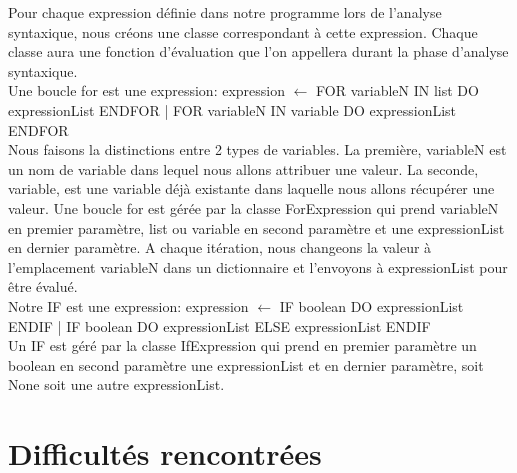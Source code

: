 ﻿\documentclass{report}
\begin{document}
Pour chaque expression définie dans notre programme lors de l'analyse syntaxique, nous créons une classe correspondant à cette expression. Chaque classe aura une fonction d'évaluation que l'on appellera durant la phase d'analyse syntaxique.\\


Une boucle for est une expression: expression $\leftarrow$ FOR variableN IN list DO expressionList ENDFOR | FOR variableN IN variable DO expressionList ENDFOR\\ 
Nous faisons la distinctions entre 2 types de variables. La première, variableN est un nom de variable dans lequel nous allons attribuer une valeur. La seconde, variable, est une variable déjà existante dans laquelle nous allons récupérer une valeur. Une boucle for est gérée par la classe ForExpression qui prend variableN en premier paramètre, list ou variable en second paramètre et une expressionList en dernier paramètre. A chaque itération, nous changeons la valeur à l'emplacement variableN dans un dictionnaire et l'envoyons à expressionList pour être évalué.\\

Notre IF est une expression: expression $\leftarrow$ IF boolean DO expressionList ENDIF | IF boolean DO expressionList ELSE expressionList ENDIF\\
Un IF est géré par la classe IfExpression qui prend en premier paramètre un boolean en second paramètre une expressionList et en dernier paramètre, soit None soit une autre expressionList.


\section*{ Difficultés rencontrées }
\end{document}
